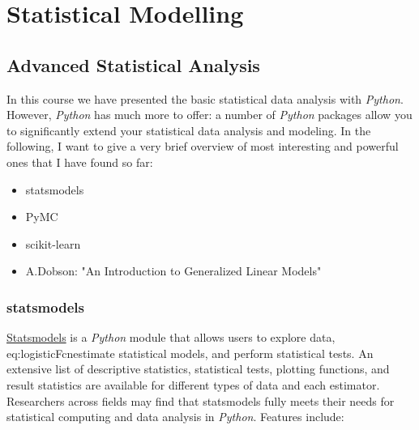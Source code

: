 \part{Statistical Modelling}

\chapter{Advanced Statistical Analysis}

In this course we have presented the basic statistical data analysis with \emph{Python}. However, \emph{Python} has much more to offer: a number of \emph{Python} packages allow you to significantly extend your statistical data analysis and modeling. In the following, I want to give a very brief overview of most interesting and powerful ones that I have found so far:

\begin{itemize}
  \item statsmodels
  \item PyMC
  \item scikit-learn
  \item A.Dobson: "An Introduction to Generalized Linear Models"
\end{itemize}

\section{statsmodels}

\href{http://statsmodels.sourceforge.net/}{Statsmodels} is a \emph{Python} module that allows users to explore data, eq:logisticFcnestimate statistical models, and perform statistical tests. An extensive list of descriptive statistics, statistical tests, plotting functions, and result statistics are available for different types of data and each estimator. Researchers across fields may find that statsmodels fully meets their needs for statistical computing and data analysis in \emph{Python}. Features include:

